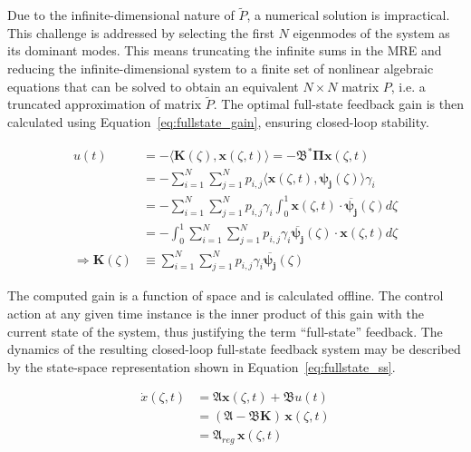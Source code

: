 Due to the infinite-dimensional nature of $\tilde{P}$, a numerical solution is impractical. This challenge is addressed by selecting the first $N$ eigenmodes of the system as its dominant modes. This means truncating the infinite sums in the MRE and reducing the infinite-dimensional system to a finite set of nonlinear algebraic equations that can be solved to obtain an equivalent $N \times N$ matrix $P$, i.e. a truncated approximation of matrix $\tilde{P}$. The optimal full-state feedback gain is then calculated using Equation~\ref{eq:fullstate_gain}, ensuring closed-loop stability.

\begin{equation} \label{eq:fullstate_gain}
    \begin{aligned}
        u(t) &= - \langle \bm{K}(\zeta), \bm{x}(\zeta, t) \rangle = - \mathfrak{B}^* \mathbf{\Pi} \bm{x}(\zeta, t) \\
        &= - \sum_{i=1}^N\sum_{j=1}^N p_{i,j} \langle \bm{x}(\zeta, t), \bm{\psi_j}(\zeta) \rangle \gamma_i \\
        &= - \sum_{i=1}^N\sum_{j=1}^N p_{i,j} \gamma_i \int_0^1 \bm{x}(\zeta, t) \cdot \overline{\bm{\psi_j}}(\zeta) d\zeta \\
        &= - \int_0^1 \sum_{i=1}^N\sum_{j=1}^N p_{i,j} \gamma_i \overline{\bm{\psi_j}}(\zeta) \cdot \bm{x}(\zeta, t) d\zeta \\
        \Rightarrow \bm{K}(\zeta) &\equiv \sum_{i=1}^N\sum_{j=1}^N p_{i,j} \gamma_i \overline{\bm{\psi_j}}(\zeta)
    \end{aligned}
\end{equation}

The computed gain is a function of space and is calculated offline. The control action at any given time instance is the inner product of this gain with the current state of the system, thus justifying the term ``full-state'' feedback. The dynamics of the resulting closed-loop full-state feedback system may be described by the state-space representation shown in Equation~\ref{eq:fullstate_ss}.

\begin{equation}
    \begin{aligned} \label{eq:fullstate_ss}
        \dot{x}(\zeta, t) &= \mathfrak{A} \bm{x}(\zeta, t) + \mathfrak{B} u(t) \\
        &= (\mathfrak{A} - \mathfrak{B} \bm{K}) \, \bm{x}(\zeta, t) \\
        &= \mathfrak{A}_{reg} \, \bm{x}(\zeta, t)
    \end{aligned}
\end{equation}

